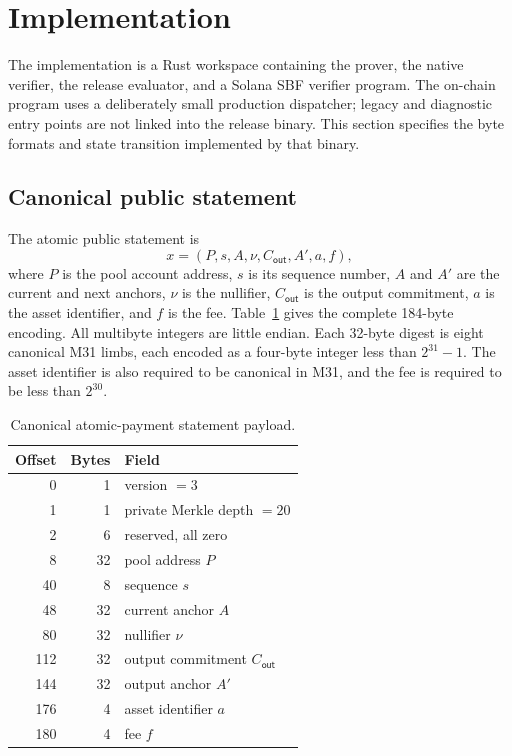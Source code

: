 \section{Implementation}
\label{sec:implementation}

The implementation is a Rust workspace containing the prover, the native
verifier, the release evaluator, and a Solana SBF verifier program.  The
on-chain program uses a deliberately small production dispatcher; legacy and
diagnostic entry points are not linked into the release binary.  This section
specifies the byte formats and state transition implemented by that binary.

\subsection{Canonical public statement}
\label{sec:implementation-statement}

The atomic public statement is
\[
  x=(P,s,A,\nu,C_{\mathsf{out}},A',a,f),
\]
where \(P\) is the pool account address, \(s\) is its sequence number, \(A\)
and \(A'\) are the current and next anchors, \(\nu\) is the nullifier,
\(C_{\mathsf{out}}\) is the output commitment, \(a\) is the asset identifier,
and \(f\) is the fee.  Table~\ref{tab:statement-wire} gives the complete
184-byte encoding.  All multibyte integers are little endian.  Each 32-byte
digest is eight canonical M31 limbs, each encoded as a four-byte integer less
than \(2^{31}-1\).  The asset identifier is also required to be canonical in
M31, and the fee is required to be less than \(2^{30}\).

\begin{table}[t]
  \centering
  \small
  \caption{Canonical atomic-payment statement payload.}
  \label{tab:statement-wire}
  \begin{tabular}{r r l}
    \toprule
    Offset & Bytes & Field \\
    \midrule
    0   & 1  & version \(=3\) \\
    1   & 1  & private Merkle depth \(=20\) \\
    2   & 6  & reserved, all zero \\
    8   & 32 & pool address \(P\) \\
    40  & 8  & sequence \(s\) \\
    48  & 32 & current anchor \(A\) \\
    80  & 32 & nullifier \(\nu\) \\
    112 & 32 & output commitment \(C_{\mathsf{out}}\) \\
    144 & 32 & output anchor \(A'\) \\
    176 & 4  & asset identifier \(a\) \\
    180 & 4  & fee \(f\) \\
    \bottomrule
  \end{tabular}
\end{table}

